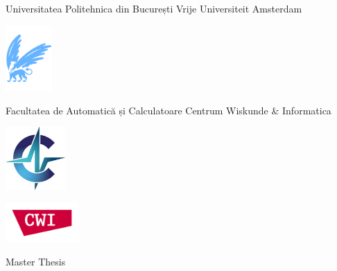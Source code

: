 \documentclass[twoside,11pt]{Latex/Classes/PhDthesisPSnPDF}
\begin{document}
\thispagestyle{empty}

\begin{center}

\hspace*{-5mm}Universitatea Politehnica din București \hspace*{1.6cm} Vrije Universiteit Amsterdam

\vspace{1mm}

\hspace*{-7.5cm}\vspace*{1mm}

\vspace*{-2.5cm}\hspace*{8cm}\includegraphics[height=25mm]{0_frontmatter/figures/vu-griffioen.pdf}

\vspace{5mm}

\hspace*{-1mm}Facultatea de Automatică și Calculatoare \hspace*{1cm} Centrum Wiskunde \& Informatica

\vspace{1mm}

\hspace*{-7.5cm}\includegraphics[height=24mm]{0_frontmatter/figures/acs_logo.jpg}

\vspace*{-2cm}\hspace*{7.5cm}\includegraphics[height=15mm]{0_frontmatter/figures/cwi-logo.png}

\vspace{2.25cm}

{\Large Master Thesis}


\end{center}
\end{document}
